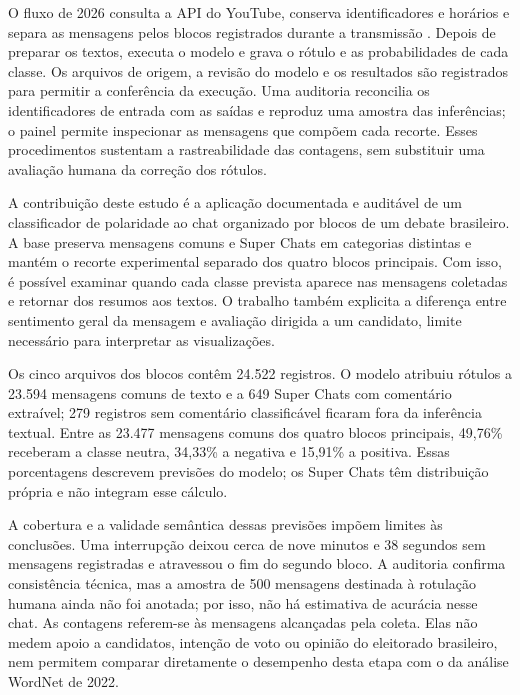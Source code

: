 O fluxo de 2026 consulta a API do YouTube, conserva identificadores e horários e separa as mensagens pelos blocos registrados durante a transmissão \cite{YouTubeLiveChatMessages}. Depois de preparar os textos, executa o modelo e grava o rótulo e as probabilidades de cada classe. Os arquivos de origem, a revisão do modelo e os resultados são registrados para permitir a conferência da execução. Uma auditoria reconcilia os identificadores de entrada com as saídas e reproduz uma amostra das inferências; o painel permite inspecionar as mensagens que compõem cada recorte. Esses procedimentos sustentam a rastreabilidade das contagens, sem substituir uma avaliação humana da correção dos rótulos.

A contribuição deste estudo é a aplicação documentada e auditável de um classificador de polaridade ao chat organizado por blocos de um debate brasileiro. A base preserva mensagens comuns e Super Chats em categorias distintas e mantém o recorte experimental separado dos quatro blocos principais. Com isso, é possível examinar quando cada classe prevista aparece nas mensagens coletadas e retornar dos resumos aos textos. O trabalho também explicita a diferença entre sentimento geral da mensagem e avaliação dirigida a um candidato, limite necessário para interpretar as visualizações.

Os cinco arquivos dos blocos contêm 24.522 registros. O modelo atribuiu rótulos a 23.594 mensagens comuns de texto e a 649 Super Chats com comentário extraível; 279 registros sem comentário classificável ficaram fora da inferência textual. Entre as 23.477 mensagens comuns dos quatro blocos principais, 49,76\% receberam a classe neutra, 34,33\% a negativa e 15,91\% a positiva. Essas porcentagens descrevem previsões do modelo; os Super Chats têm distribuição própria e não integram esse cálculo.

A cobertura e a validade semântica dessas previsões impõem limites às conclusões. Uma interrupção deixou cerca de nove minutos e 38 segundos sem mensagens registradas e atravessou o fim do segundo bloco. A auditoria confirma consistência técnica, mas a amostra de 500 mensagens destinada à rotulação humana ainda não foi anotada; por isso, não há estimativa de acurácia nesse chat. As contagens referem-se às mensagens alcançadas pela coleta. Elas não medem apoio a candidatos, intenção de voto ou opinião do eleitorado brasileiro, nem permitem comparar diretamente o desempenho desta etapa com o da análise WordNet de 2022.
